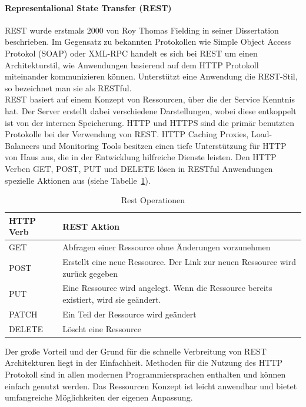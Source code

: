 	\paragraph{Representalional State Transfer (REST)}
		REST wurde erstmals 2000 von Roy Thomas Fielding in seiner Dissertation beschrieben. Im Gegensatz zu bekannten Protokollen wie Simple Object Access Protokol (SOAP) oder XML-RPC handelt es sich bei REST um einen Architekturstil, wie Anwendungen basierend auf dem HTTP Protokoll miteinander kommunizieren können. Unterstützt eine Anwendung die REST-Stil, so bezeichnet man sie als RESTful.
		\cite[vgl.][]{Melzer.2010} \\
		REST basiert auf einem Konzept von Ressourcen, über die der Service Kenntnis hat. Der Server erstellt dabei verschiedene Darstellungen, wobei diese entkoppelt ist von der internen Speicherung.
		HTTP und HTTPS sind die primär benutzten Protokolle bei der Verwendung von REST. HTTP Caching Proxies, Load-Balancers und Monitoring Tools besitzen einen tiefe Unterstützung für HTTP von Haus aus, die in der Entwicklung hilfreiche Dienste leisten.
		Den HTTP Verben GET, POST, PUT und DELETE lösen in RESTful Anwendungen spezielle Aktionen aus (siehe Tabelle~\ref{tbl:RestOperationen}).
		\\
		
		\begin{table}[h]
		
		\begin{tabular}{|p{3.5cm}|p{12.5cm}|}
		\hline 
		\textbf{HTTP Verb} & \textbf{REST Aktion} \\ 
		\hline 
		GET & Abfragen einer Ressource ohne Änderungen vorzunehmen \\ 
		\hline 
		POST & Erstellt eine neue Ressource. Der Link zur neuen Ressource wird zurück gegeben \\ 
		\hline 
		PUT & Eine Ressource wird angelegt. Wenn die Ressource bereits existiert, wird sie geändert. \\ 
		\hline 
		PATCH & Ein Teil der Ressource wird geändert \\ 
		\hline 
		DELETE & Löscht eine Ressource \\ 
		\hline 
		\end{tabular} 
		\caption{Rest Operationen}
		\label{tbl:RestOperationen}
		\end{table}
		
		Der große Vorteil und der Grund für die schnelle Verbreitung von REST Architekturen liegt in der Einfachheit. Methoden für die Nutzung des HTTP Protokoll sind in allen modernen Programmiersprachen enthalten und können einfach genutzt werden. Das Ressourcen Konzept ist leicht anwendbar und bietet umfangreiche Möglichkeiten der eigenen Anpassung.
		
